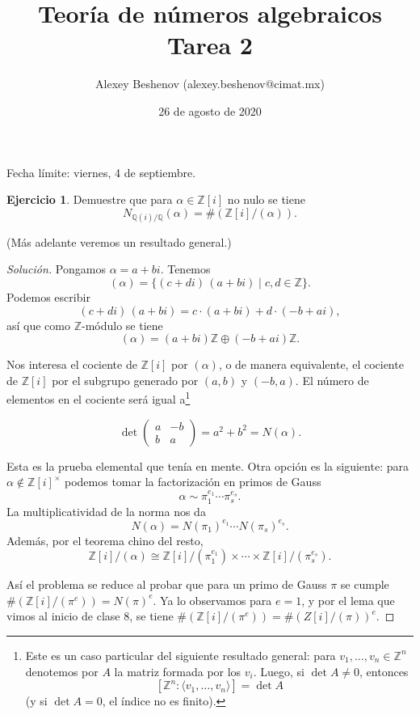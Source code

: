 \documentclass{article}
\title{Teoría de números algebraicos\\Tarea 2}
\author{Alexey Beshenov (alexey.beshenov@cimat.mx)}
\date{26 de agosto de 2020}
\newcounter{tarea}
\theoremstyle{definition}
\newtheorem{ejercicio}{Ejercicio}[tarea]
\newenvironment{solucion}{\begin{proof}[Solución]}{\end{proof}}
\newcommand{\ZZ}{\mathbb{Z}}
\begin{document}
{\sffamily\bfseries\maketitle}

\noindent Fecha límite: viernes, 4 de septiembre.

\ifdefined\solutions
\else
\thispagestyle{empty}
\fi

\begin{ejercicio}
  Demuestre que para $\alpha \in \mathbb{Z} [i]$ no nulo se tiene
  $$N_{\mathbb{Q} (i)/\mathbb{Q}} (\alpha) = \# (\mathbb{Z} [i]/(\alpha)).$$

  \noindent (Más adelante veremos un resultado general.)

  \ifdefined\solutions
  \begin{solucion}
    Pongamos $\alpha = a + bi$. Tenemos
    $$(\alpha) = \{(c + di)\,(a + bi) \mid c, d \in \ZZ \}.$$
    Podemos escribir
    $$(c + di)\,(a + bi) = c \cdot (a + bi) + d \cdot (-b + ai),$$
    así que como $\ZZ$-módulo se tiene
    $$(\alpha) = (a + bi) \ZZ \oplus (-b + ai) \ZZ.$$

    Nos interesa el cociente de $\ZZ[i]$ por $(\alpha)$, o de manera
    equivalente, el cociente de $\ZZ[i]$ por el subgrupo generado por $(a, b)$ y
    $(-b, a)$. El número de elementos en el cociente será igual a\footnote{Este
      es un caso particular del siguiente resultado general: para
      $v_1, \ldots, v_n \in \ZZ^n$ denotemos por $A$ la matriz formada por los
      $v_i$. Luego, si $\det A \ne 0$, entonces
      $$[\ZZ^n : \langle v_1, \ldots , v_n\rangle] = \det A$$
      (y si $\det A = 0$, el índice no es finito).}

    \[ \det \begin{pmatrix} a & -b \\ b & a\end{pmatrix}
       = a^2 + b^2 = N(\alpha). \]

    Esta es la prueba elemental que tenía en mente. Otra opción es la
    siguiente: para $\alpha \notin \ZZ[i]^\times$ podemos tomar la
    factorización en primos de Gauss
    $$\alpha \sim \pi_1^{e_1} \cdots \pi_s^{e_s}.$$
    La multiplicatividad de la norma nos da
    $$N(\alpha) = N (\pi_1)^{e_1} \cdots N(\pi_s)^{e_s}.$$
    Además, por el teorema chino del resto,
    \[ \ZZ[i]/(\alpha) \cong
       \ZZ[i]/(\pi_1^{e_1}) \times \cdots \times \ZZ[i]/(\pi_s^{e_s}). \]

    Así el problema se reduce al probar que para un primo de Gauss $\pi$ se
    cumple $\# (\ZZ[i]/(\pi^e)) = N (\pi)^e$. Ya lo observamos para $e = 1$, y
    por el lema que vimos al inicio de clase 8, se tiene
    $\#(\ZZ[i]/(\pi^e)) = \#(Z[i]/(\pi))^e$.
  \end{solucion}
  \fi
\end{ejercicio}
\end{document}
